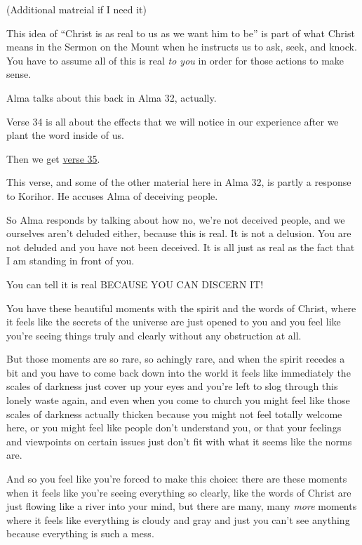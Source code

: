 \begin{compactitem}
			\item (Additional matreial if I need it)
				\begin{compactitem}
					\item This idea of ``Christ is as real to us as we want him to be'' is part of what Christ means in the Sermon on the Mount when he instructs us to ask, seek, and knock. You have to assume all of this is real \textit{to you} in order for those actions to make sense.
					\item Alma talks about this back in Alma 32, actually.
					\item Verse 34 is all about the effects that we will notice in our experience after we plant the word inside of us.
					\item Then we get \hyperref[ALMA-32-35]{verse 35}.
					\item This verse, and some of the other material here in Alma 32, is partly a response to Korihor. He accuses Alma of deceiving people.
					\item So Alma responds by talking about how no, we're not deceived people, and we ourselves aren't deluded either, because this is real. It is not a delusion. You are not deluded and you have not been deceived. It is all just as real as the fact that I am standing in front of you.
					\item You can tell it is real BECAUSE YOU CAN DISCERN IT!
					\item You have these beautiful moments with the spirit and the words of Christ, where it feels like the secrets of the universe are just opened to you and you feel like you're seeing things truly and clearly without any obstruction at all.
					\item But those moments are so rare, so achingly rare, and when the spirit recedes a bit and you have to come back down into the world it feels like immediately the scales of darkness just cover up your eyes and you're left to slog through this lonely waste again, and even when you come to church you might feel like those scales of darkness actually thicken because you might not feel totally welcome here, or you might feel like people don't understand you, or that your feelings and viewpoints on certain issues just don't fit with what it seems like the norms are.
					\item And so you feel like you're forced to make this choice: there are these moments when it feels like you're seeing everything so clearly, like the words of Christ are just flowing like a river into your mind, but there are many, many \textit{more} moments where it feels like everything is cloudy and gray and just you can't see anything because everything is such a mess.

\end{compactitem}
\end{compactitem}
